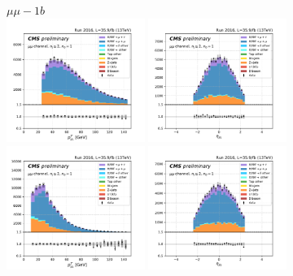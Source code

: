 \begin{figure}[ht]
    \centering
    $\mu\mu - 1b$ \\
    \includegraphics[width=0.4\textwidth]{chapters/Analysis/sectionPlots/figures/kinematics_pickles/mumu/1b/mumu_1b_lepton1_pt.pdf}
    \includegraphics[width=0.4\textwidth]{chapters/Analysis/sectionPlots/figures/kinematics_pickles/mumu/1b/mumu_1b_lepton1_eta.pdf}
    \includegraphics[width=0.4\textwidth]{chapters/Analysis/sectionPlots/figures/kinematics_pickles/mumu/1b/mumu_1b_lepton2_pt.pdf}
    \includegraphics[width=0.4\textwidth]{chapters/Analysis/sectionPlots/figures/kinematics_pickles/mumu/1b/mumu_1b_lepton2_eta.pdf}

\end{figure}
